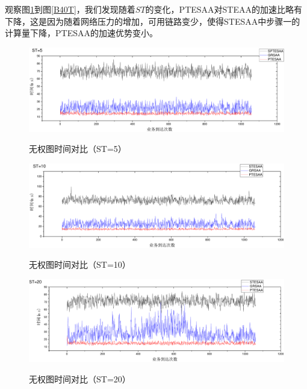 观察图\ref{B5T}到图\ref{B40T}，我们发现随着$ST$的变化，PTESAA对STEAA的加速比略有下降，这是因为随着网络压力的增加，可用链路变少，使得STESAA中步骤一的计算量下降，PTESAA的加速优势变小。
\begin{figure}
\setlength{\belowcaptionskip}{-0.1cm}
\begin{center}
{\includegraphics[width=1 \textwidth]{figures/B5T.pdf}}
\end{center}
\caption{{\footnotesize{无权图时间对比（ST=5）}}}
\label{B5T}
\end{figure}
\begin{figure}
\setlength{\belowcaptionskip}{-0.5cm}
\begin{center}
{\includegraphics[width=1 \textwidth]{figures/B10T.pdf}}
\end{center}
\caption{{\footnotesize{无权图时间对比（ST=10）}}}
\label{B10T}
\end{figure}
\begin{figure}
\vspace{-0.2cm}
\setlength{\belowcaptionskip}{-0.5cm}
\begin{center}
{\includegraphics[width=1 \textwidth]{figures/B20T.pdf}}
\end{center}
\caption{{\footnotesize{无权图时间对比（ST=20）}}}
\label{B20T}
\end{figure}

